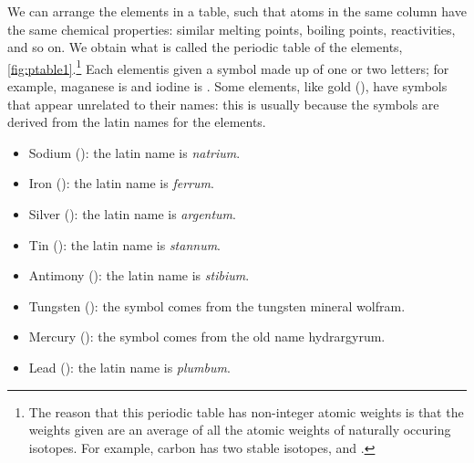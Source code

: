 \documentclass[a4paper]{memoir}
\begin{document}
We can arrange the elements in a table, such that atoms in the same column have the same chemical properties: similar melting points, boiling
points, reactivities, and so on. We obtain what is called the periodic table of the elements, \cref{fig:ptable1}.\footnote{The reason that this
periodic table has non-integer atomic weights is that the weights given are an average of all the atomic weights of naturally occuring isotopes.
For example, carbon has two stable isotopes,  and .} Each elementis given a symbol made up of one or two letters; for example,
maganese is  and iodine is . Some elements, like gold (), have symbols that appear unrelated to their names: this is usually
because the symbols are derived from the latin names for the elements.
\begin{itemize}
  \item Sodium (): the latin name is \textit{natrium}.
  \item Iron (): the latin name is \textit{ferrum}.
  \item Silver (): the latin name is \textit{argentum}.
  \item Tin (): the latin name is \textit{stannum}.
  \item Antimony (): the latin name is \textit{stibium}.
  \item Tungsten (): the symbol comes from the tungsten mineral wolfram.
  \item Mercury (): the symbol comes from the old name hydrargyrum.
  \item Lead (): the latin name is \textit{plumbum}.
\end{itemize}
\end{document}
